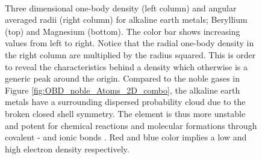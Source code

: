 \begin{figure}
\begin{center}
     \\
  \caption{Three dimensional one-body density (left column) and angular averaged radii (right column) for alkaline earth metals; Beryllium (top) and Magnesium (bottom). The color bar shows increasing values from left to right. Notice that the radial one-body density in the right column are multiplied by the radius squared. This is order to reveal the characteristics behind a density which otherwise is a generic peak around the origin. Compared to the noble gases in Figure \ref{fig:OBD_noble_Atoms_2D_combo}, the alkaline earth metals have a surrounding dispersed probability cloud due to the broken closed shell symmetry. The element is thus more unstable and potent for chemical reactions and molecular formations through covalent - and ionic bonds \cite{UniversityPhysics}. Red and blue color implies a low and high electron density respectively.}
  \label{fig:OBD_alkaline_Atoms_2D_combo}
 \end{center}
\end{figure}
 
